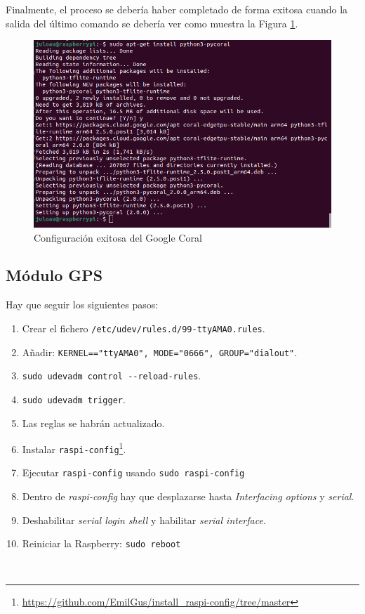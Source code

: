 Finalmente, el proceso se debería haber completado de forma exitosa cuando la salida del último comando se debería ver como muestra la Figura \ref{fig:outcoral}.

\begin{figure} [h!]
	\begin{center}
		\includegraphics[width=12cm]{figs/cap6/pycoralinstalled.png}
	\end{center}
	\caption{Configuración exitosa del Google Coral}
	\label{fig:outcoral}
\end{figure} 


\subsection{Módulo GPS}
\label{subsec:anexogps}

Hay que seguir los siguientes pasos: 

\begin{enumerate}
	\item Crear el fichero \verb|/etc/udev/rules.d/99-ttyAMA0.rules|.
	\item Añadir: \verb|KERNEL=="ttyAMA0", MODE="0666", GROUP="dialout"|.
	\item \verb|sudo udevadm control --reload-rules|.
	\item \verb|sudo udevadm trigger|.
	\item Las reglas se habrán actualizado. 
	\item Instalar \verb|raspi-config|\footnote{\url{https://github.com/EmilGus/install_raspi-config/tree/master}}.
	\item Ejecutar \verb|raspi-config| usando \verb|sudo raspi-config|
	\item Dentro de \textit{raspi-config} hay que desplazarse hasta \textit{Interfacing options} y \textit{serial}.
	\item Deshabilitar \textit{serial login shell} y habilitar \textit{serial interface}.
	\item Reiniciar la Raspberry: \verb|sudo reboot|
\end{enumerate}\

